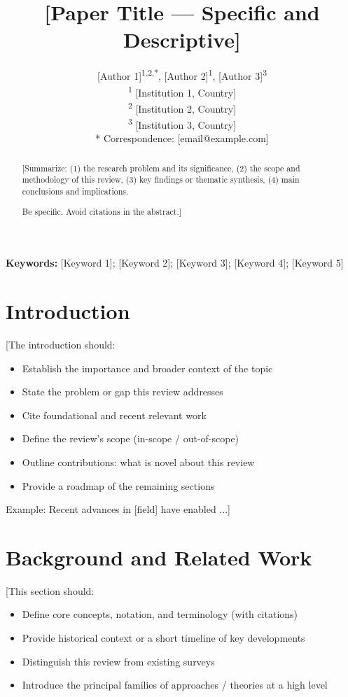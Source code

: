 \documentclass[11pt,a4paper]{article}
\title{[Paper Title — Specific and Descriptive]}
\author{
    [Author 1]\textsuperscript{1,2,*},
    [Author 2]\textsuperscript{1},
    [Author 3]\textsuperscript{3} \\[0.5em]
    \small
    \textsuperscript{1} [Institution 1, Country] \\
    \textsuperscript{2} [Institution 2, Country] \\
    \textsuperscript{3} [Institution 3, Country] \\[0.3em]
    * Correspondence: [email@example.com]
}
\date{}
\begin{document}
\maketitle

\begin{abstract}
[Summarize:
(1) the research problem and its significance,
(2) the scope and methodology of this review,
(3) key findings or thematic synthesis,
(4) main conclusions and implications.

Be specific. Avoid citations in the abstract.]
\end{abstract}

\vspace{0.5cm}
\noindent\textbf{Keywords:} [Keyword 1]; [Keyword 2]; [Keyword 3]; [Keyword 4]; [Keyword 5]

\section{Introduction}
[The introduction should:
\begin{itemize}
    \item Establish the importance and broader context of the topic
    \item State the problem or gap this review addresses
    \item Cite foundational and recent relevant work \citep{key1,key2}
    \item Define the review's scope (in-scope / out-of-scope)
    \item Outline contributions: what is novel about this review
    \item Provide a roadmap of the remaining sections
\end{itemize}

Example: Recent advances in [field] have enabled \citep{author2023survey}...]

\section{Background and Related Work}
[This section should:
\begin{itemize}
    \item Define core concepts, notation, and terminology (with citations)
    \item Provide historical context or a short timeline of key developments
    \item Distinguish this review from existing surveys \citep{smithmeta2022}
    \item Introduce the principal families of approaches / theories at a high level
\end{itemize}
\end{document}
